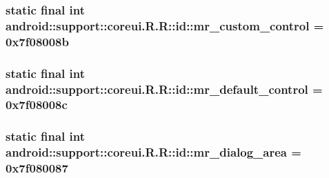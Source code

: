 \hypertarget{classandroid_1_1support_1_1coreui_1_1_r_1_1id_5b97c929bebdc85a37fa22660b539ef6}{
\subsubsection[{mr\_\-custom\_\-control}]{\setlength{\rightskip}{0pt plus 5cm}static final int android::support::coreui.R.R::id::mr\_\-custom\_\-control = 0x7f08008b}}
\label{classandroid_1_1support_1_1coreui_1_1_r_1_1id_5b97c929bebdc85a37fa22660b539ef6}


\hypertarget{classandroid_1_1support_1_1coreui_1_1_r_1_1id_f93873811dbbe1a2c9e850b10d460fe2}{
\subsubsection[{mr\_\-default\_\-control}]{\setlength{\rightskip}{0pt plus 5cm}static final int android::support::coreui.R.R::id::mr\_\-default\_\-control = 0x7f08008c}}
\label{classandroid_1_1support_1_1coreui_1_1_r_1_1id_f93873811dbbe1a2c9e850b10d460fe2}


\hypertarget{classandroid_1_1support_1_1coreui_1_1_r_1_1id_ce8bc026aebcb008bef3955bceb36835}{
\subsubsection[{mr\_\-dialog\_\-area}]{\setlength{\rightskip}{0pt plus 5cm}static final int android::support::coreui.R.R::id::mr\_\-dialog\_\-area = 0x7f080087}}
\label{classandroid_1_1support_1_1coreui_1_1_r_1_1id_ce8bc026aebcb008bef3955bceb36835}


